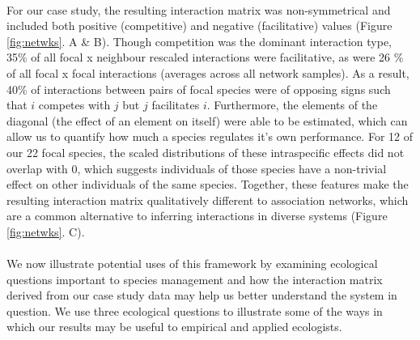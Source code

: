 \documentclass[a4,12pt]{article}
\begin{document}
    \paragraph{}
     For our case study, the resulting interaction matrix was non-symmetrical and included both positive (competitive) and negative (facilitative) values (Figure \ref{fig:netwks}. A \& B). Though competition was the dominant interaction type,  35\% of all focal x neighbour rescaled interactions were facilitative, as were 26 \% of all focal x focal interactions (averages across all network samples). As a result, 40\% of interactions between pairs of focal species were of opposing signs such that $i$ competes with $j$ but $j$ facilitates $i$. 
     Furthermore, the elements of the diagonal (the effect of an element on itself) were able to be estimated, which can allow us to quantify how much a species regulates it's own performance. For 12 of our 22 focal species, the scaled distributions of these intraspecific effects did not overlap with 0, which suggests individuals of those species have a non-trivial effect on other individuals of the same species. Together, these features make the resulting interaction matrix qualitatively different to association networks, which are a common alternative to inferring interactions in diverse systems (Figure \ref{fig:netwks}. C). 


    \paragraph{}
    We now illustrate potential uses of this framework by examining ecological questions important to species management and how the interaction matrix derived from our case study data may help us better understand the system in question. 
    We use three ecological questions to illustrate some of the ways in which our results may be useful to empirical and applied ecologists.
 
\end{document}
